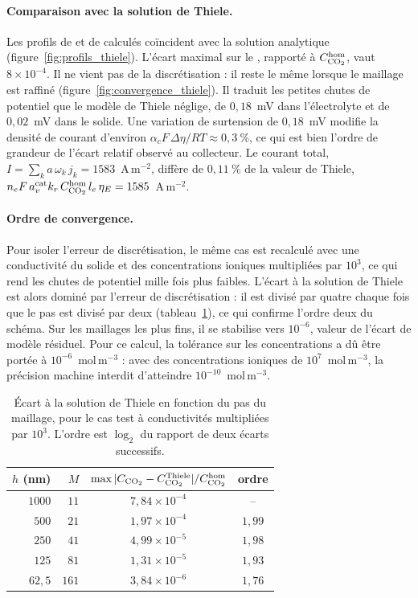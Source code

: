 \paragraph{Comparaison avec la solution de Thiele.} Les profils de 
et de  calculés coïncident avec la solution analytique
(figure~\ref{fig:profils_thiele}). L'écart maximal sur le , rapporté
à $C_{\ce{CO2}}^{\mathrm{hom}}$, vaut $8\times10^{-4}$. Il ne vient pas de
la discrétisation : il reste le même lorsque le maillage est raffiné
(figure~\ref{fig:convergence_thiele}). Il traduit les petites chutes de
potentiel que le modèle de Thiele néglige, de $0{,}18$~mV dans l'électrolyte
et de $0{,}02$~mV dans le solide. Une variation de surtension de $0{,}18$~mV
modifie la densité de courant d'environ
$\alpha_c F\,\Delta\eta/RT \approx 0{,}3~\%$, ce qui est bien l'ordre de
grandeur de l'écart relatif observé au collecteur. Le courant total,
$I = \sum_k a\,\omega_k\, j_k = 1583$~A\,m$^{-2}$, diffère de $0{,}11~\%$ de
la valeur de Thiele, $n_eF\,a_v^{\mathrm{cat}}k_r\,C^{\mathrm{hom}}_{\ce{CO2}}\,l_e\,\eta_E
= 1585$~A\,m$^{-2}$.

\paragraph{Ordre de convergence.} Pour isoler l'erreur de discrétisation, le
même cas est recalculé avec une conductivité du solide et des concentrations
ioniques multipliées par $10^3$, ce qui rend les chutes de potentiel mille fois
plus faibles. L'écart à la solution de Thiele est alors dominé par l'erreur de
discrétisation : il est divisé par quatre chaque fois que le pas est divisé par
deux (tableau~\ref{tab:convergence}), ce qui confirme l'ordre deux du schéma.
Sur les maillages les plus fins, il se stabilise vers $10^{-6}$, valeur de
l'écart de modèle résiduel. Pour ce calcul, la tolérance sur les
concentrations a dû être portée à $10^{-6}$~mol\,m$^{-3}$ : avec des
concentrations ioniques de $10^{7}$~mol\,m$^{-3}$, la précision machine
interdit d'atteindre $10^{-10}$~mol\,m$^{-3}$.

\begin{table}[H]
\centering
\begin{tabular}{rrcc}
\hline
$h$ (nm) & $M$ & $\max|C_{\ce{CO2}} - C^{\mathrm{Thiele}}_{\ce{CO2}}|/C^{\mathrm{hom}}_{\ce{CO2}}$ & ordre \\
\hline
$1000$ & $11$  & $7{,}84\times10^{-4}$ & -- \\
$500$  & $21$  & $1{,}97\times10^{-4}$ & $1{,}99$ \\
$250$  & $41$  & $4{,}99\times10^{-5}$ & $1{,}98$ \\
$125$  & $81$  & $1{,}31\times10^{-5}$ & $1{,}93$ \\
$62{,}5$ & $161$ & $3{,}84\times10^{-6}$ & $1{,}76$ \\
\hline
\end{tabular}
\caption{Écart à la solution de Thiele en fonction du pas du maillage, pour
le cas test à conductivités multipliées par $10^3$. L'ordre est
$\log_2$ du rapport de deux écarts successifs.}
\label{tab:convergence}
\end{table}

